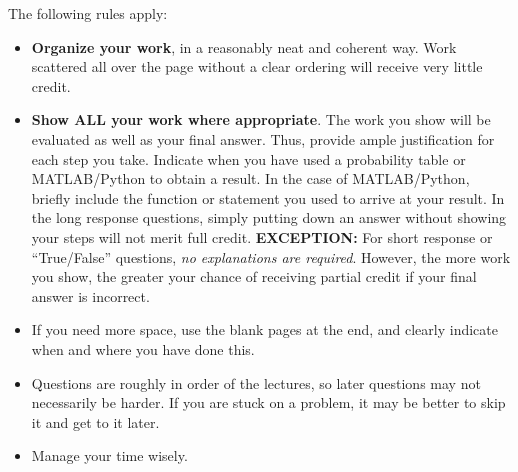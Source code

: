\documentclass[12pt,twoside]{article}
\newcommand{\?}{\stackrel{?}{=}}
\begin{document}
\noindent The following rules apply: 
\begin{itemize}


\item \textbf{Organize your work}, in a reasonably neat and coherent way.%
 Work scattered all over the page without a clear ordering will
receive very little credit.

\item \textbf{Show ALL your work where appropriate}.
  The work you show will be evaluated as well as your final answer.
  Thus, provide ample justification for each step you take.
  Indicate when you have used a probability table or MATLAB/Python to obtain a result.
  In the case of MATLAB/Python, briefly include the function or statement you used to arrive at your result.
  In the long response questions, simply putting down an answer without showing your steps  will not merit full credit.
  {\bf EXCEPTION:} For short response or ``True/False'' questions, \textit{no explanations are required}.
  However, the more work you show, the greater your chance of receiving partial credit if your final answer is incorrect.

\item If you need more space, use the blank pages at the end, and clearly indicate when and where you have done this.

\item Questions are roughly in order of the lectures, so later questions may not necessarily be harder.
  If you are stuck on a problem, it may be better to skip it and get to it later.

\item Manage your time wisely.%

\end{itemize}
\end{document}
